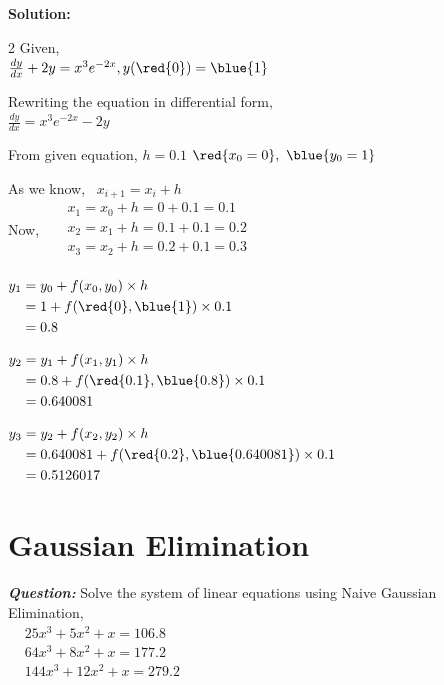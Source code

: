 \textbf{Solution:}
\begin{multicols}{2}
\noindent
\raggedcolumns
Given,\\[0.5em]
$\frac{dy}{dx}+2y= x^3e^{-2x}, y(\red{0})=\blue{1}$

Rewriting the equation in differential form,\\[0.5em]
$\frac{dy}{dx} = x^3e^{-2x} - 2y$

From given equation, $h = 0.1$ \quad $\red{x_0 = 0}, \ \blue{y_0 = 1}$


As we know, \ $x_{i+1}=x_i+h$\\
Now, \
$\begin{aligned}
   & x_1=x_0+h=0+0.1=0.1\\
   & x_2=x_1+h=0.1+0.1=0.2\\
   & x_3=x_2+h=0.2+0.1=0.3\\
\end{aligned}$


\columnbreak

$\begin{aligned}
   y_1 & = y_0 + f(x_0,y_0) \times h \\
   & = 1 + f(\red{0},\blue{1}) \times 0.1 \\
   & = 0.8
\end{aligned}$

$\begin{aligned}
   y_2 & = y_1 + f(x_1,y_1) \times h \\
   & = 0.8 + f(\red{0.1},\blue{0.8}) \times 0.1 \\
   & = 0.640081
\end{aligned}$

$\begin{aligned}
   y_3 & = y_2 + f(x_2,y_2) \times h \\
   & = 0.640081 + f(\red{0.2},\blue{0.640081}) \times 0.1 \\
   & = 0.5126017
\end{aligned}$
\end{multicols}



\section*{Gaussian Elimination}
\textbf{\textit{Question:}} 
Solve the system of linear equations using Naive Gaussian Elimination,\\[0.5em]
$\begin{aligned}
   & 25x^3 + 5x^2 + x = 106.8 \\
   & 64x^3 + 8x^2 + x = 177.2 \\
   & 144x^3 + 12x^2 + x = 279.2 \\
\end{aligned}$



